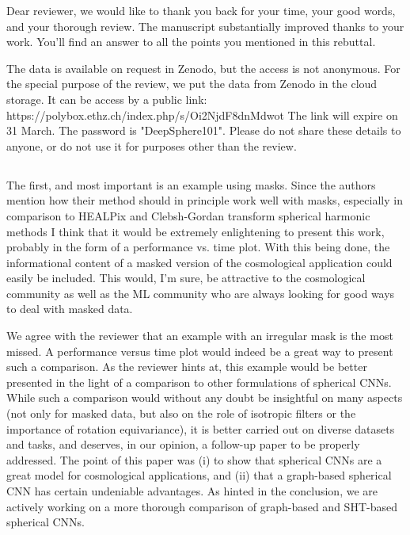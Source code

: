 \documentclass[12pt,a4paper]{article}
\newcommand{\1}{\b{1}}              %
\newcommand{\0}{\b{0}}              %
\begin{document}
Dear reviewer, we would like to thank you back for your time, your good words, and your thorough review.
The manuscript substantially improved thanks to your work.
You'll find an answer to all the points you mentioned in this rebuttal.

The data is available on request in Zenodo, but the access is not anonymous.
For the special purpose of the review, we put the data from Zenodo in the cloud storage.
It can be access by a public link:
https://polybox.ethz.ch/index.php/s/Oi2NjdF8dnMdwot
The link will expire on 31 March.
The password is "DeepSphere101".
Please do not share these details to anyone, or do not use it for purposes other than the review.

\subsection{}

\begin{mdframed}[style=comment]
The first, and most important is an example using masks. Since the authors mention how their method should in principle work well with masks, especially in comparison to HEALPix and Clebsh-Gordan transform spherical harmonic methods I think that it would be extremely enlightening to present this work, probably in the form of a performance vs. time plot. With this being done, the informational content of a masked version of the cosmological application could easily be included. This would, I'm sure, be attractive to the cosmological community as well as the ML community who are always looking for good ways to deal with masked data.
\end{mdframed}

We agree with the reviewer that an example with an irregular mask is the most missed.
A performance versus time plot would indeed be a great way to present such a comparison.
As the reviewer hints at, this example would be better presented in the light of a comparison to other formulations of spherical CNNs.
While such a comparison would without any doubt be insightful on many aspects (not only for masked data, but also on the role of isotropic filters or the importance of rotation equivariance), it is better carried out on diverse datasets and tasks, and deserves, in our opinion, a follow-up paper to be properly addressed.
The point of this paper was (i) to show that spherical CNNs are a great model for cosmological applications, and (ii) that a graph-based spherical CNN has certain undeniable advantages.
As hinted in the conclusion, we are actively working on a more thorough comparison of graph-based and SHT-based spherical CNNs.
\end{document}
